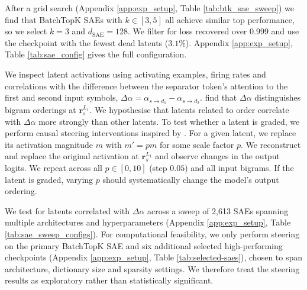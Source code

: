 After a grid search (Appendix \ref{app:exp_setup}, Table \ref{tab:btk_sae_sweep}) we find that BatchTopK SAEs with $k \in [3,5]$ all achieve similar top performance, so we select $k=3$ and $d_\text{SAE}=128$.
We filter for loss recovered over 0.999 and use the checkpoint with the fewest dead latents ($3.1\%$). Appendix \ref{app:exp_setup}, Table \ref{tab:sae_config} gives the full configuration.

We inspect latent activations using activating examples, firing rates and correlations with the difference between the separator token's attention to the first and second input symbols,
\( 
\Delta \alpha = \alpha_{s \to d_1} - 
\alpha_{s \to d_2}
\). \citet{farrell2025order} find that $\Delta \alpha$ distinguishes bigram orderings at $\boldsymbol r_{s}^{L_1}$. We hypothesise that latents related to order correlate with $\Delta \alpha$ more strongly than other latents.
To test whether a latent is graded, we perform causal steering interventions inspired by \citet{brien2025steering}.
For a given latent, we replace its activation magnitude $m$ with $m' = pm$ for some scale factor $p$. We reconstruct and replace the original activation at $\boldsymbol r_{s}^{L_1}$ and observe changes in the output logits. We repeat across all $p \in [0, 10]$ (step $0.05$) and all input bigrams. If the latent is graded, varying $p$ should systematically change the model's output ordering.

We test for latents correlated with $\Delta \alpha$ across a sweep of 2,613 SAEs spanning multiple architectures and hyperparameters (Appendix \ref{app:exp_setup}, Table \ref{tab:sae_sweep_configs}).
For computational feasibility, we only perform steering on the primary BatchTopK SAE and six additional selected high-performing checkpoints (Appendix \ref{app:exp_setup}, Table \ref{tab:selected-saes}), chosen to span architecture, dictionary size and sparsity settings. We therefore treat the steering results as exploratory rather than statistically significant.

